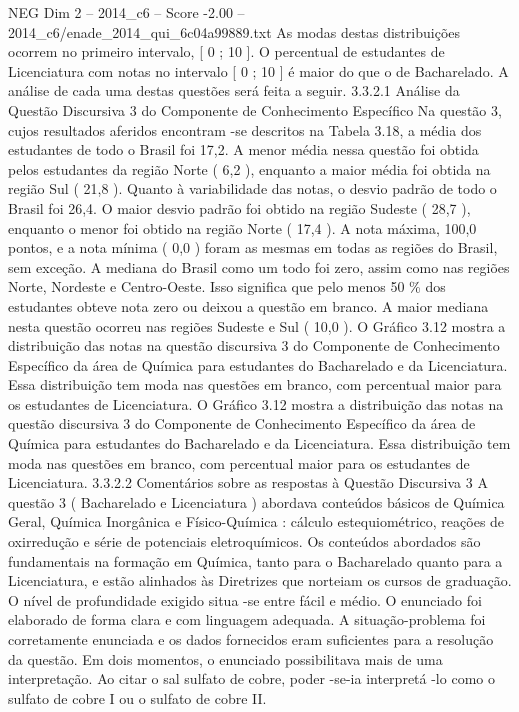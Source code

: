 \begin{textsample}{NEG Dim 2 – 2014\_c6 – Score -2.00 – 2014\_c6/enade\_2014\_qui\_6c04a99889.txt}
As modas destas distribuições ocorrem no primeiro intervalo, [ 0 ; 10 ].
O percentual de estudantes de Licenciatura com notas no intervalo [ 0 ; 10 ] é maior do que o de Bacharelado.
A análise de cada uma destas questões será feita a seguir. 3.3.2.1 Análise da Questão Discursiva 3 do Componente de Conhecimento Específico Na questão 3, cujos resultados aferidos encontram -se descritos na Tabela 3.18, a média dos estudantes de todo o Brasil foi 17,2.
A menor média nessa questão foi obtida pelos estudantes da região Norte ( 6,2 ), enquanto a maior média foi obtida na região Sul ( 21,8 ).
Quanto à variabilidade das notas, o desvio padrão de todo o Brasil foi 26,4.
O maior desvio padrão foi obtido na região Sudeste ( 28,7 ), enquanto o menor foi obtido na região Norte ( 17,4 ).
A nota máxima, 100,0 pontos, e a nota mínima ( 0,0 ) foram as mesmas em todas as regiões do Brasil, sem exceção.
A mediana do Brasil como um todo foi zero, assim como nas regiões Norte, Nordeste e Centro-Oeste.
Isso significa que pelo menos 50 \% dos estudantes obteve nota zero ou deixou a questão em branco.
A maior mediana nesta questão ocorreu nas regiões Sudeste e Sul ( 10,0 ).
O Gráfico 3.12 mostra a distribuição das notas na questão discursiva 3 do Componente de Conhecimento Específico da área de Química para estudantes do Bacharelado e da Licenciatura.
Essa distribuição tem moda nas questões em branco, com percentual maior para os estudantes de Licenciatura.
O Gráfico 3.12 mostra a distribuição das notas na questão discursiva 3 do Componente de Conhecimento Específico da área de Química para estudantes do Bacharelado e da Licenciatura.
Essa distribuição tem moda nas questões em branco, com percentual maior para os estudantes de Licenciatura. 3.3.2.2 Comentários sobre as respostas à Questão Discursiva 3 A questão 3 ( Bacharelado e Licenciatura ) abordava conteúdos básicos de Química Geral, Química Inorgânica e Físico-Química : cálculo estequiométrico, reações de oxirredução e série de potenciais eletroquímicos.
Os conteúdos abordados são fundamentais na formação em Química, tanto para o Bacharelado quanto para a Licenciatura, e estão alinhados às Diretrizes que norteiam os cursos de graduação.
O nível de profundidade exigido situa -se entre fácil e médio.
O enunciado foi elaborado de forma clara e com linguagem adequada.
A situação-problema foi corretamente enunciada e os dados fornecidos eram suficientes para a resolução da questão.
Em dois momentos, o enunciado possibilitava mais de uma interpretação.
Ao citar o sal sulfato de cobre, poder -se-ia interpretá -lo como o sulfato de cobre I ou o sulfato de cobre II.

\end{textsample}
